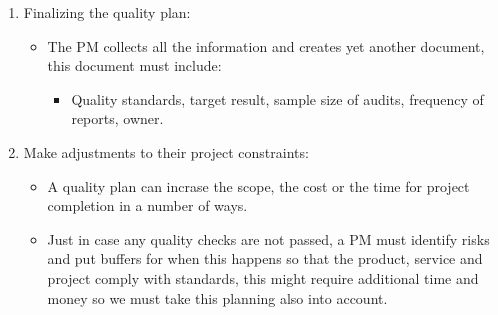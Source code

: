 \begin{itemize}
\begin{enumerate}
            \item Finalizing the quality plan:
                \begin{itemize}
                    \item The PM collects all the information and creates yet another document, this document must include:
                        \begin{itemize}
                            \item Quality standards, target result, sample size of audits, frequency of reports, owner.
                        \end{itemize}
                \end{itemize}
            
            \item Make adjustments to their project constraints:
                \begin{itemize}
                    \item A quality plan can incrase the scope, the cost or the time for project completion in a number of ways. 
                    \item Just in case any quality checks are not passed, a PM must identify risks and put buffers for when this happens so that the product, service and project comply with standards, this might require additional time and money so we must take this planning also into account.
                \end{itemize}
        \end{enumerate}
\end{itemize}
